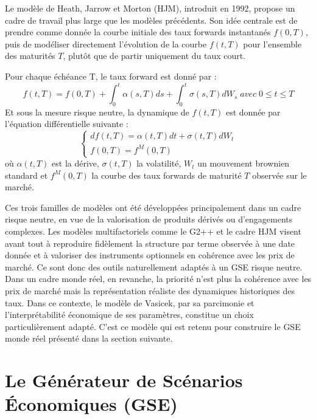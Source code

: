 Le modèle de Heath, Jarrow et Morton (HJM), introduit en 1992, propose un cadre de travail plus large que les modèles précédents. Son idée centrale est de prendre comme donnée la courbe initiale des taux forwards instantanés $f(0,T)$, puis de modéliser directement l'évolution de la courbe $f(t,T)$ pour l'ensemble des maturités $T$, plutôt que de partir uniquement du taux court. 

Pour chaque échéance T, le taux forward est donné par : 
\begin{equation}
    f(t,T) = f(0,T) + \int_0^t \alpha(s,T) ds + \int_0^t \sigma(s,T) dW_s \; avec \; 0\leq t \leq T
\end{equation}
Et sous la mesure risque neutre, la dynamique de $f(t,T)$ est donnée par l'équation différentielle suivante :
\begin{equation}
\begin{cases}
df(t,T) = \alpha(t,T) dt + \sigma(t,T) dW_t \\
f(0,T) = f^M(0,T)
\end{cases}
\end{equation}
où $\alpha(t,T)$ est la dérive, $\sigma(t,T)$ la volatilité, $W_t$ un mouvement brownien standard et $f^M(0,T)$ la courbe des taux forwards de maturité $T$ observée sur le marché.

Ces trois familles de modèles ont été développées principalement dans un cadre risque neutre, en vue de la valorisation de produits dérivés ou d'engagements complexes. Les modèles multifactoriels comme le G2++ et le cadre HJM visent avant tout à reproduire fidèlement la structure par terme observée à une date donnée et à valoriser des instruments optionnels en cohérence avec les prix de marché. Ce sont donc des outils naturellement adaptés à un GSE risque neutre. Dans un cadre monde réel, en revanche, la priorité n'est plus la cohérence avec les prix de marché mais la représentation réaliste des dynamiques historiques des taux. Dans ce contexte, le modèle de Vasicek, par sa parcimonie et l'interprétabilité économique de ses paramètres, constitue un choix particulièrement adapté. C'est ce modèle qui est retenu pour construire le GSE monde réel présenté dans la section suivante.


\section{Le Générateur de Scénarios Économiques (GSE)}

